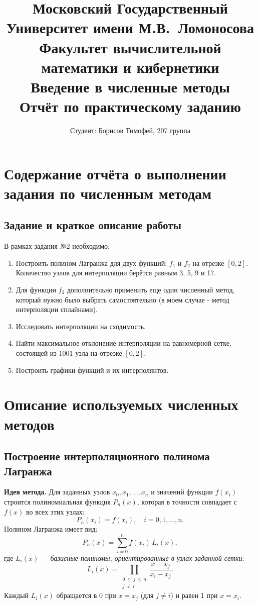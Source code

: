 \documentclass[a4paper, fleqn]{report}
\title{
\textbf{Московский Государственный Университет имени М.В.\ Ломоносова}\\
\textbf{Факультет вычислительной математики и кибернетики}\\
\textbf{Введение в численные методы}\\
Отчёт по практическому заданию
}
\author{
Студент: Борисов Тимофей, 207 группа
}
\date{\number\year}
\begin{document}
\maketitle

\tableofcontents

\chapter{Содержание отчёта о выполнении задания по численным методам}

\section*{Задание и краткое описание работы}

В рамках задания №2 необходимо:
\begin{enumerate}
    \item Построить полином Лагранжа для двух функций: \( f_1 \) и \( f_2 \) на отрезке \([0, 2]\). Количество узлов для интерполяции берётся равным 3, 5, 9 и 17.
    \item Для функции \( f_2 \) дополнительно применить еще один численный метод, который нужно было выбрать самостоятельно (в моем случае - метод интерполяции сплайнами).
    \item Исследовать интерполяции на сходимость.
    \item Найти максимальное отклонение интерполяции на равномерной сетке, состоящей из 1001 узла на отрезке \([0, 2]\).
    \item Построить графики функций и их интерполянтов.
\end{enumerate}

\newpage

\chapter{Описание используемых численных методов}

\section{Построение интерполяционного полинома Лагранжа}

\textbf{Идея метода.} Для заданных узлов \( x_0, x_1, \ldots, x_n \) и значений функции \( f(x_i) \) строится полиномиальная функция \( P_n(x) \), которая в точности совпадает с \( f(x) \) во всех этих узлах:
\[
P_n(x_i) = f(x_i), \quad i = 0,1,\ldots,n.
\]
Полином Лагранжа имеет вид:
\[
P_n(x) = \sum_{i=0}^{n} f(x_i) \, L_i(x),
\]
где \(\displaystyle L_i(x)\) --- \textit{базисные полиномы, ориентированные в узлах заданной сетки}:
\[
L_i(x) = \prod_{\substack{0 \,\le\, j \,\le\, n \\ j \,\neq\, i}} \frac{x - x_j}{x_i - x_j}.
\]
Каждый \( L_i(x) \) обращается в 0 при \( x = x_j \) (для \( j \neq i \)) и равен 1 при \( x = x_i \).
\end{document}
